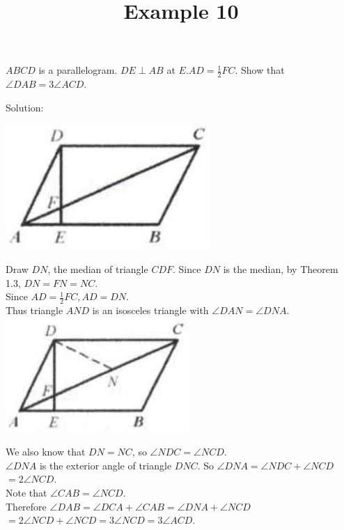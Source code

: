 \documentclass{article}
\title{Example 10}
\date{}
\begin{document}
\maketitle

\(A B C D\) is a parallelogram. \(D E \perp A B\) at \(E . A D=\frac{1}{2} F C\). Show that \(\angle D A B=3 \angle A C D\).

Solution:
\begin{center}
\includegraphics[width=\textwidth]{images/problem_image_1.jpg}
\end{center}

Draw \(D N\), the median of triangle \(C D F\). Since \(D N\) is the median, by Theorem 1.3, \(D N=F N=N C\).\\
Since \(A D=\frac{1}{2} F C, A D=D N\).\\
Thus triangle \(A N D\) is an isosceles triangle with \(\angle D A N=\angle D N A\).\\
\centering
\includegraphics[width=\textwidth]{images/reasoning_image_1.jpg}

We also know that \(D N=N C\), so \(\angle N D C=\angle N C D\).\\
\(\angle D N A\) is the exterior angle of triangle \(D N C\). So \(\angle D N A=\angle N D C+\angle N C D\)\\
\(=2 \angle N C D\).\\
Note that \(\angle C A B=\angle N C D\).\\
Therefore \(\angle D A B=\angle D C A+\angle C A B=\angle D N A+\angle N C D\)\\
\(=2 \angle N C D+\angle N C D=3 \angle N C D=3 \angle A C D\).
\end{document}
